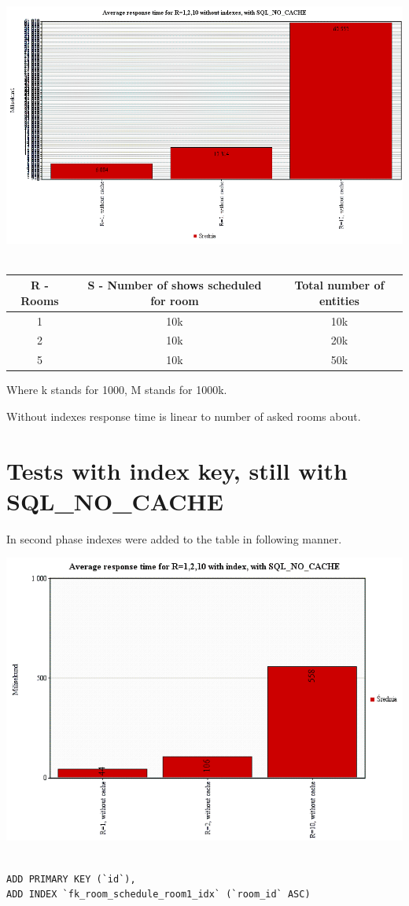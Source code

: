 \documentclass[10pt,a4paper]{article}
\begin{document}
\includegraphics[width=1.15\textwidth]{./avrg_without_indexes}~\\[1cm]
\begin{tabular}{|c|c||c|}
\hline
R - Rooms & 
S - Number of shows scheduled for room & 
Total number of entities \\
\hline
1 &
10k &
10k \\
\hline
2 &
10k &
20k \\
\hline
5 & 
10k & 
50k \\
\hline 
\end{tabular} 
Where k stands for 1000, M stands for 1000k. 

Without indexes response time is linear to number of asked rooms about. 
\section{Tests with index key, still with SQL\_NO\_CACHE}
In second phase indexes were added to the table in following manner. 

\includegraphics[width=1.15\textwidth]{./avrg_with_indexes}~\\[1cm]
\lstset{language=SQL}
\begin{lstlisting}[frame=single]
ADD PRIMARY KEY (`id`),
ADD INDEX `fk_room_schedule_room1_idx` (`room_id` ASC)
\end{lstlisting}
\end{document}
